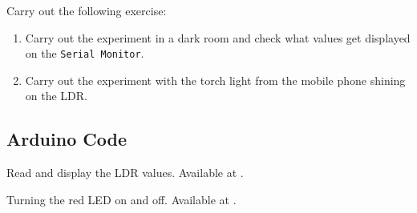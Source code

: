 \begin{exercise}
  Carry out the following exercise:
  \begin{enumerate}
    \item Carry out the experiment in a dark room and check what values
          get displayed on the {\tt Serial Monitor}.
    \item Carry out the experiment with the torch light from the mobile
          phone shining on the LDR.
  \end{enumerate}
\end{exercise}

\subsection{Arduino Code}
\label{sec:ldr-arduino-code}

\begin{ardcode}
  {Read and display the LDR values.  Available at
    .}
  \label{ard:ldr-read}
  
\end{ardcode}

\begin{ardcode}
  {Turning the red LED on and off.  Available at
    .}
  \label{ard:ldr-led}
  
\end{ardcode}

